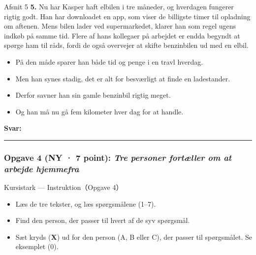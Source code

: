 \begin{emailbox}{Afsnit 5}
\textbf{5.} Nu har Kasper haft elbilen i tre måneder, og hverdagen fungerer rigtig godt. Han har downloadet en app, som viser de billigste timer til opladning om aftenen. Mens bilen lader ved supermarkedet, klarer han som regel ugens indkøb på samme tid. \underline{\hspace{2.8cm}} Flere af hans kollegaer på arbejdet er endda begyndt at spørge ham til råds, fordi de også overvejer at skifte benzinbilen ud med en elbil.
\vspace{0.35em}
\begin{itemize}[leftmargin=1.6em, itemsep=0.15em]
  \item[\textbf{A.}] På den måde sparer han både tid og penge i en travl hverdag.
  \item[\textbf{B.}] Men han synes stadig, det er alt for besværligt at finde en ladestander.
  \item[\textbf{C.}] Derfor savner han sin gamle benzinbil rigtig meget.
  \item[\textbf{D.}] Og han må nu gå fem kilometer hver dag for at handle.
\end{itemize}
\hfill \textbf{Svar:} \rule{1.2cm}{0.4pt}
\end{emailbox}

\subsubsection*{Opgave 4 (NY · 7 point): \textit{Tre personer fortæller om at arbejde hjemmefra}}

\begin{emailbox}{Kursistark --- Instruktion（Opgave 4）}
\begin{itemize}
  \item Læs de tre tekster, og læs spørgsmålene (1--7).
  \item Find den person, der passer til hvert af de syv spørgsmål.
  \item Sæt kryds (\textbf{X}) ud for den person (A, B eller C), der passer til spørgsmålet. Se eksemplet (0).
\end{itemize}
\end{emailbox}

